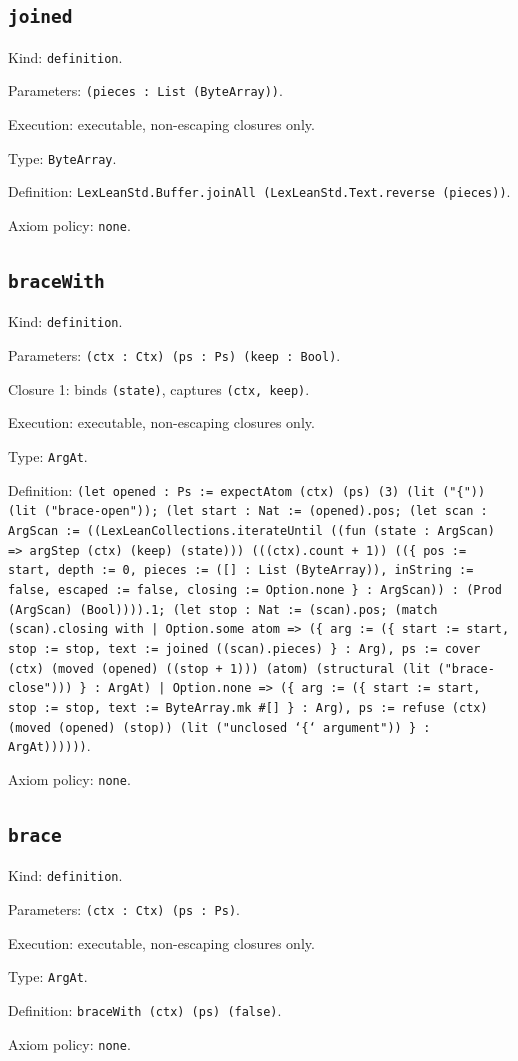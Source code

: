 \documentclass[11pt]{article}
\begin{document}
\subsection*{\texttt{joined}}
\noindent Kind: \texttt{definition}.\par
\noindent Parameters: \texttt{(pieces : List (ByteArray))}.\par
\noindent Execution: executable, non-escaping closures only.\par
\noindent Type: \texttt{ByteArray}.\par
\noindent Definition: \texttt{LexLeanStd.Buffer.joinAll (LexLeanStd.Text.reverse (pieces))}.\par
\noindent Axiom policy: \texttt{none}.\par
\subsection*{\texttt{braceWith}}
\noindent Kind: \texttt{definition}.\par
\noindent Parameters: \texttt{(ctx : Ctx) (ps : Ps) (keep : Bool)}.\par
\noindent Closure 1: binds \texttt{(state)}, captures \texttt{(ctx, keep)}.\par
\noindent Execution: executable, non-escaping closures only.\par
\noindent Type: \texttt{ArgAt}.\par
\noindent Definition: \texttt{(let opened : Ps := expectAtom (ctx) (ps) (3) (lit ("\{")) (lit ("brace-open")); (let start : Nat := (opened).pos; (let scan : ArgScan := ((LexLeanCollections.iterateUntil ((fun (state : ArgScan) => argStep (ctx) (keep) (state))) (((ctx).count + 1)) ((\{ pos := start, depth := 0, pieces := ([] : List (ByteArray)), inString := false, escaped := false, closing := Option.none \} : ArgScan)) : (Prod (ArgScan) (Bool)))).1; (let stop : Nat := (scan).pos; (match (scan).closing with | Option.some atom => (\{ arg := (\{ start := start, stop := stop, text := joined ((scan).pieces) \} : Arg), ps := cover (ctx) (moved (opened) ((stop + 1))) (atom) (structural (lit ("brace-close"))) \} : ArgAt) | Option.none => (\{ arg := (\{ start := start, stop := stop, text := ByteArray.mk \#[] \} : Arg), ps := refuse (ctx) (moved (opened) (stop)) (lit ("unclosed `\{` argument")) \} : ArgAt))))))}.\par
\noindent Axiom policy: \texttt{none}.\par
\subsection*{\texttt{brace}}
\noindent Kind: \texttt{definition}.\par
\noindent Parameters: \texttt{(ctx : Ctx) (ps : Ps)}.\par
\noindent Execution: executable, non-escaping closures only.\par
\noindent Type: \texttt{ArgAt}.\par
\noindent Definition: \texttt{braceWith (ctx) (ps) (false)}.\par
\noindent Axiom policy: \texttt{none}.\par
\end{document}
